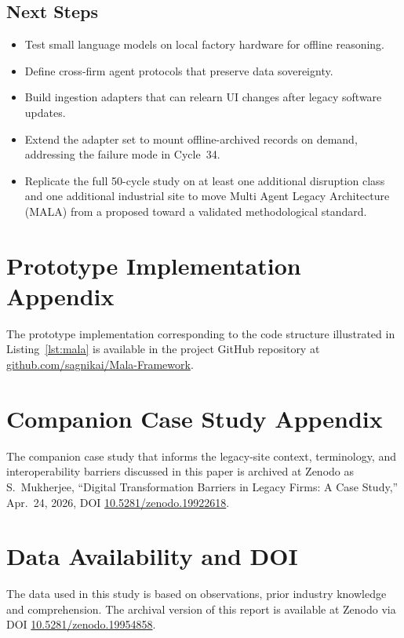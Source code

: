 \documentclass[conference]{IEEEtran}
\newcommand{\MALA}{Multi Agent Legacy Architecture (MALA)}
\begin{document}
\subsection*{Next Steps}
\begin{itemize}
  \item Test small language models on local factory hardware for offline reasoning.
  \item Define cross-firm agent protocols that preserve data sovereignty.
  \item Build ingestion adapters that can relearn UI changes after legacy software updates.
  \item Extend the adapter set to mount offline-archived records on demand, addressing the failure mode in Cycle~34.
  \item Replicate the full 50-cycle study on at least one additional disruption class and one additional industrial site to move \MALA{} from a proposed toward a validated methodological standard.
\end{itemize}


\appendices
\section{Prototype Implementation Appendix}
The prototype implementation corresponding to the code structure illustrated in Listing~\ref{lst:mala} is available in the project GitHub repository at \href{https://github.com/sagnikai/Mala-Framework}{github.com/sagnikai/Mala-Framework}.

\section{Companion Case Study Appendix}\label{app:case_study}
The companion case study that informs the legacy-site context, terminology, and interoperability barriers discussed in this paper is archived at Zenodo as S.~Mukherjee, ``Digital Transformation Barriers in Legacy Firms: A Case Study,'' Apr.~24, 2026, DOI \href{https://doi.org/10.5281/zenodo.19922618}{10.5281/zenodo.19922618}.

\section*{Data Availability and DOI}

The data used in this study is based on observations, prior industry knowledge and comprehension. The archival version of this report is available at Zenodo via DOI \href{https://doi.org/10.5281/zenodo.19954858}{10.5281/zenodo.19954858}.
\end{document}
